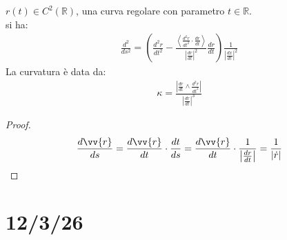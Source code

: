 \documentclass[a4paper, oneside]{article}
\begin{document}
\begin{theorem}
     $r(t) \in C^2(\mathbb{R})$, una curva regolare con parametro $t \in \mathbb{R}$.\\
     si ha:
    \begin{gather*}
        \frac{d^2}{ds^2} = \left( \frac{d^2r}{dt^2} - \frac{\left\langle \frac{d^2r}{dt^2} \cdot \frac{dr}{dt} \right\rangle }{\left\lvert \frac{dr}{dt} \right\rvert^2 } \frac{dr}{dt}\right) \frac{1}{\left\lvert \frac{dx}{dt} \right\rvert^2 }
    \end{gather*}
    La curvatura è data da:
    \begin{gather*}
        \kappa = \frac{\left\lvert \frac{dr}{dt} \land \frac{d^2r}{dt^2}\right\rvert }{\left\lvert \frac{dr}{dt} \right\rvert^3 }
    \end{gather*}
\end{theorem}
\begin{proof}
    \hfill\\
    \begin{gather*}
        \frac{d\vv{r}}{ds} = \frac{d\vv{r}}{dt} \cdot \frac{dt}{ds} = \frac{d\vv{r}}{dt} \cdot \frac{1}{\left\lvert \frac{dr}{dt} \right\rvert } = \frac{1}{\left\lvert \dot{r} \right\rvert } \\
    \end{gather*}
\end{proof}

\section{12/3/26}
\end{document}
